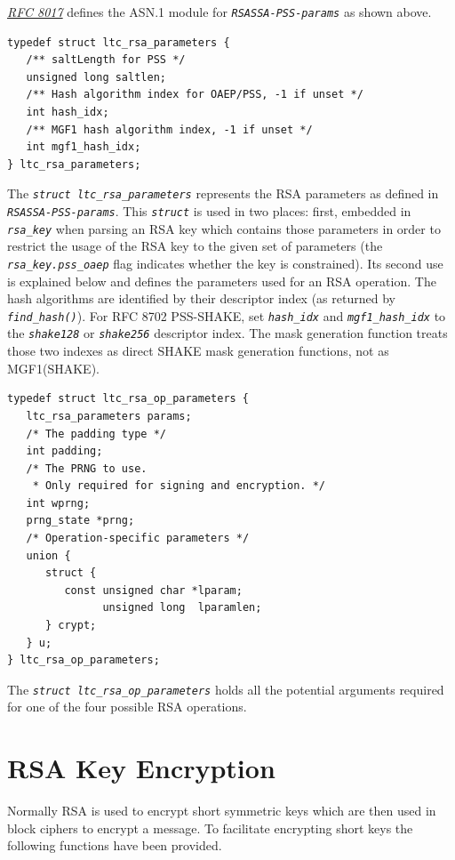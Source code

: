 \documentclass[synpaper]{book}
\newcommand{\code}[1]{\texttt{\textit{#1}}}
\newcommand{\mysection}[1]    %
	{                   %
	\section{#1}
   \markboth{\textsf{www.libtom.net}}{\thesection ~ {#1}}
	}
\begin{document}
\href{https://datatracker.ietf.org/doc/html/rfc8017}{\textit{RFC 8017}} defines the ASN.1 module for \code{RSASSA-PSS-params} as shown above.

\begin{small}
\begin{verbatim}
typedef struct ltc_rsa_parameters {
   /** saltLength for PSS */
   unsigned long saltlen;
   /** Hash algorithm index for OAEP/PSS, -1 if unset */
   int hash_idx;
   /** MGF1 hash algorithm index, -1 if unset */
   int mgf1_hash_idx;
} ltc_rsa_parameters;
\end{verbatim}
\end{small}

The \code{struct ltc\_rsa\_parameters} represents the RSA parameters as defined in \code{RSASSA-PSS-params}.
This \code{struct} is used in two places: first, embedded in \code{rsa\_key} when parsing an RSA key which contains those parameters
in order to restrict the usage of the RSA key to the given set of parameters (the \code{rsa\_key.pss\_oaep} flag indicates whether
the key is constrained). Its second use is explained below and defines the parameters used for an RSA operation.
The hash algorithms are identified by their descriptor index (as returned by \code{find\_hash()}).
For RFC 8702 PSS-SHAKE, set \code{hash\_idx} and \code{mgf1\_hash\_idx} to the \code{shake128} or \code{shake256} descriptor index.
The mask generation function treats those two indexes as direct SHAKE mask generation functions, not as MGF1(SHAKE).

\begin{small}
\begin{verbatim}
typedef struct ltc_rsa_op_parameters {
   ltc_rsa_parameters params;
   /* The padding type */
   int padding;
   /* The PRNG to use.
    * Only required for signing and encryption. */
   int wprng;
   prng_state *prng;
   /* Operation-specific parameters */
   union {
      struct {
         const unsigned char *lparam;
               unsigned long  lparamlen;
      } crypt;
   } u;
} ltc_rsa_op_parameters;
\end{verbatim}
\end{small}

The \code{struct ltc\_rsa\_op\_parameters} holds all the potential arguments required for one of the four possible RSA operations.


\mysection{RSA Key Encryption}
Normally RSA is used to encrypt short symmetric keys which are then used in block ciphers to encrypt a message.
To facilitate encrypting short keys the following functions have been provided.
\end{document}
